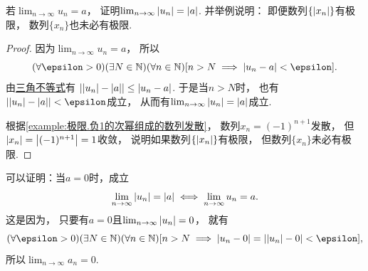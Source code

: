\begin{example}
若\(\lim_{n\to\infty} u_n = a\)，
证明\(\lim_{n\to\infty} \abs{u_n} = \abs{a}\).
并举例说明：
即便数列\(\{\abs{x_n}\}\)有极限，
数列\(\{x_n\}\)也未必有极限.
\begin{proof}
因为\(\lim_{n\to\infty} u_n = a\)，
所以\begin{equation*}
	(\forall\epsilon>0)
	(\exists N\in\mathbb{N})
	(\forall n\in\mathbb{N})
	[n>N \implies \abs{u_n-a}<\epsilon].
\end{equation*}
由\hyperref[theorem:不等式.三角不等式2]{三角不等式}有
\(\abs{\abs{u_n}-\abs{a}}\leq\abs{u_n-a}\).
于是当\(n>N\)时，
也有\(\abs{\abs{u_n}-\abs{a}}<\epsilon\)成立，
从而有\(\lim_{n\to\infty} \abs{u_n} = \abs{a}\)成立.

根据\cref{example:极限.负1的次幂组成的数列发散}，
数列\(x_n = (-1)^{n+1}\)发散，
但\(\abs{x_n} = \abs{(-1)^{n+1}} = 1\)收敛，
说明如果数列\(\{\abs{x_n}\}\)有极限，
但数列\(\{x_n\}\)未必有极限.
\end{proof}
\end{example}
\begin{remark}
可以证明：当\(a=0\)时，成立\begin{equation*}
	\lim_{n\to\infty} \abs{u_n} = \abs{a}
	\iff
	\lim_{n\to\infty} u_n = a.
\end{equation*}
这是因为，
只要有\(a=0\)且\(\lim_{n\to\infty} \abs{u_n} = 0\)，
就有\begin{equation*}
	(\forall\epsilon>0)
	(\exists N\in\mathbb{N})
	(\forall n\in\mathbb{N})
	[n>N \implies \abs{u_n-0}=\abs{\abs{u_n}-0}<\epsilon],
\end{equation*}
所以\(\lim_{n\to\infty} a_n = 0\).
\end{remark}

